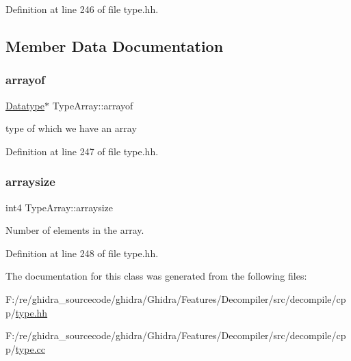 Definition at line 246 of file type.\+hh.



\subsection{Member Data Documentation}
\mbox{\label{class_type_array_a5d03b3f4155f79cd977de5e117302439}} 
\subsubsection{\texorpdfstring{arrayof}{arrayof}}
{\footnotesize\ttfamily \mbox{\hyperlink{class_datatype}{Datatype}}$\ast$ Type\+Array\+::arrayof\hspace{0.3cm}{\ttfamily [protected]}}



type of which we have an array 



Definition at line 247 of file type.\+hh.

\mbox{\label{class_type_array_aada27931106709a3cdc4d247ed84a713}} 
\subsubsection{\texorpdfstring{arraysize}{arraysize}}
{\footnotesize\ttfamily int4 Type\+Array\+::arraysize\hspace{0.3cm}{\ttfamily [protected]}}



Number of elements in the array. 



Definition at line 248 of file type.\+hh.



The documentation for this class was generated from the following files\+:\begin{DoxyCompactItemize}
\item 
F\+:/re/ghidra\+\_\+sourcecode/ghidra/\+Ghidra/\+Features/\+Decompiler/src/decompile/cpp/\mbox{\hyperlink{type_8hh}{type.\+hh}}\item 
F\+:/re/ghidra\+\_\+sourcecode/ghidra/\+Ghidra/\+Features/\+Decompiler/src/decompile/cpp/\mbox{\hyperlink{type_8cc}{type.\+cc}}\end{DoxyCompactItemize}
